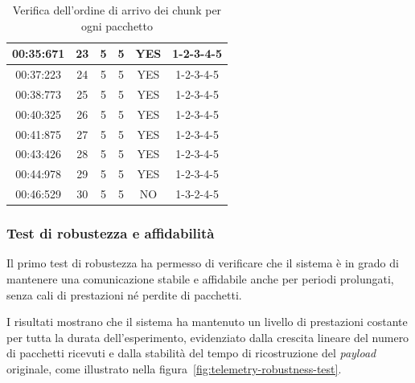 \documentclass[12pt,a4paper,twoside]{book}
\begin{document}
\begin{table}[H]
{\begin{tabular}{|c|c|c|c|c|c|}
            00:35:671      & 23                            & 5                            & 5                              & YES               & 1-2-3-4-5                 \\ \hline
            00:37:223      & 24                            & 5                            & 5                              & YES               & 1-2-3-4-5                 \\ \hline
            00:38:773      & 25                            & 5                            & 5                              & YES               & 1-2-3-4-5                 \\ \hline
            00:40:325      & 26                            & 5                            & 5                              & YES               & 1-2-3-4-5                 \\ \hline
            00:41:875      & 27                            & 5                            & 5                              & YES               & 1-2-3-4-5                 \\ \hline
            00:43:426      & 28                            & 5                            & 5                              & YES               & 1-2-3-4-5                 \\ \hline
            00:44:978      & 29                            & 5                            & 5                              & YES               & 1-2-3-4-5                 \\ \hline
            00:46:529      & 30                            & 5                            & 5                              & NO                & 1-3-2-4-5                 \\
            \hline
        \end{tabular}
    }
    \caption{Verifica dell'ordine di arrivo dei chunk per ogni pacchetto}
    \label{tab:chunk_order}
\end{table}
\newpage
\subsubsection{Test di robustezza e affidabilità}
Il primo test di robustezza ha permesso di verificare che il sistema è in grado
di mantenere una comunicazione stabile e affidabile anche per periodi prolungati,
senza cali di prestazioni né perdite di pacchetti.

I risultati mostrano che il sistema ha mantenuto un livello di prestazioni costante
per tutta la durata dell'esperimento, evidenziato dalla crescita lineare del
numero di pacchetti ricevuti e dalla stabilità del tempo di ricostruzione del
\emph{payload} originale, come illustrato nella figura~\ref{fig:telemetry-robustness-test}.
\end{document}
